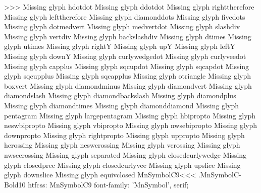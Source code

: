 >>>
Missing glyph	hdotdot
Missing glyph	ddotdot
Missing glyph	righttherefore
Missing glyph	lefttherefore
Missing glyph	diamonddots
Missing glyph	fivedots
Missing glyph	dotmedvert
Missing glyph	medvertdot
Missing glyph	slashdiv
Missing glyph	vertdiv
Missing glyph	backslashdiv
Missing glyph	dtimes
Missing glyph	utimes
Missing glyph	rightY
Missing glyph	upY
Missing glyph	leftY
Missing glyph	downY
Missing glyph	curlywedgedot
Missing glyph	curlyveedot
Missing glyph	capplus
Missing glyph	sqcupdot
Missing glyph	sqcapdot
Missing glyph	sqcupplus
Missing glyph	sqcapplus
Missing glyph	otriangle
Missing glyph	boxvert
Missing glyph	diamondminus
Missing glyph	diamondvert
Missing glyph	diamondslash
Missing glyph	diamondbackslash
Missing glyph	diamondplus
Missing glyph	diamondtimes
Missing glyph	diamonddiamond
Missing glyph	pentagram
Missing glyph	largepentagram
Missing glyph	hbipropto
Missing glyph	neswbipropto
Missing glyph	vbipropto
Missing glyph	nwsebipropto
Missing glyph	downpropto
Missing glyph	rightpropto
Missing glyph	uppropto
Missing glyph	hcrossing
Missing glyph	neswcrossing
Missing glyph	vcrossing
Missing glyph	nwsecrossing
Missing glyph	separated
Missing glyph	closedcurlywedge
Missing glyph	closedprec
Missing glyph	closedcurlyvee
Missing glyph	upslice
Missing glyph	downslice
Missing glyph	equivclosed
\<MnSymbolC9\><<<
.MnSymbolC-Bold10
htfcss:  MnSymbolC9  font-family: 'MnSymbol', serif;

